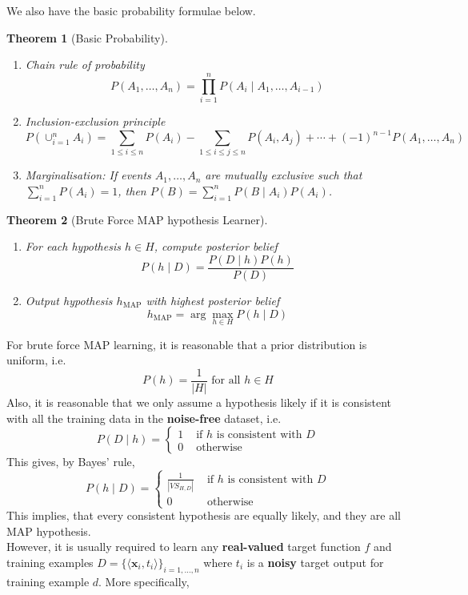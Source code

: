 \documentclass[12pt]{article}
\newtheorem{theorem}{Theorem}[section]
\theoremstyle{definition}
\begin{document}
We also have the basic probability formulae below.
\begin{theorem}[Basic Probability]
\normalfont \begin{enumerate}
\item Chain rule of probability
\[
P(A_1,\ldots, A_n)=\prod_{i=1}^n P(A_i\mid A_1,\ldots, A_{i-1})
\]
\item Inclusion-exclusion principle
\[
P(\cup_{i=1}^n A_i)=\sum_{1\leq i\leq n}P(A_i)-\sum_{1\leq i\leq j\leq n}P(A_i,A_j)+\cdots+(-1)^{n-1}P(A_1, \ldots, A_n)
\]
\item Marginalisation: If events $A_1,\ldots, A_n$ are mutually exclusive such that $\sum_{i=1}^n P(A_i)=1$, then $P(B)=\sum_{i=1}^n P(B\mid A_i)P(A_i)$.
\end{enumerate}
\end{theorem}
\begin{theorem}[Brute Force MAP hypothesis Learner]
\normalfont \begin{enumerate}
\item For each hypothesis $h\in H$, compute posterior belief
\[
P(h\mid D)=\frac{P(D\mid h)P(h)}{P(D)}
\]
\item Output hypothesis $h_{\text{MAP}}$ with highest posterior belief
\[
h_{\text{MAP}}=\arg\max_{h\in H} P(h\mid D)
\]
\end{enumerate}
\end{theorem}
For brute force MAP learning, it is reasonable that a prior distribution is uniform, i.e.
\[
P(h)=\frac{1}{|H|}\text{  for all }h\in H
\]
Also, it is reasonable that we only assume a hypothesis likely if it is consistent with all the training data in the \textbf{noise-free} dataset, i.e.
\[
P(D\mid h)=\begin{cases}
1 & \text{ if }h\text{ is consistent with }D\\
0 & \text{ otherwise}
\end{cases}
\]
This gives, by Bayes' rule, 
\[
P(h\mid D)=\begin{cases}
\frac{1}{|VS_{H,D}|} & \text{ if }h\text{ is consistent with }D\\
0 & \text{ otherwise}
\end{cases}
\]
This implies, that every consistent hypothesis are equally likely, and they are all MAP hypothesis.\\
However, it is usually required to learn any \textbf{real-valued} target function $f$ and training examples $D=\{\langle \mathbf{x}_i, t_i\rangle\}_{i=1,\ldots, n}$ where $t_i$ is a \textbf{noisy} target output for training example $d$. More specifically,
\end{document}

